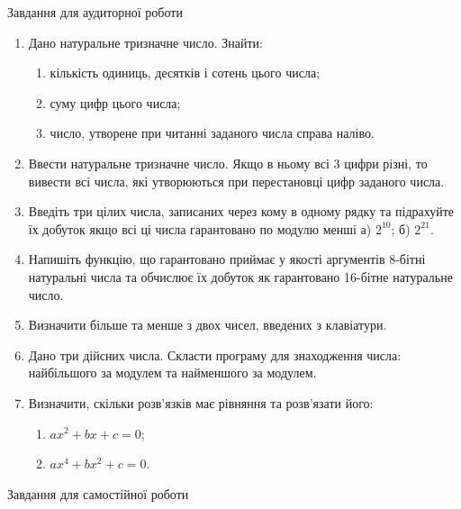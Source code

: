\documentclass[]{article}
\makeatletter
\newcommand{\xslalph}[1]{\expandafter\@xslalph\csname c@#1\endcsname}
\newcommand{\@xslalph}[1]{%
    \ifcase#1\or а\or б\or в\or г\or д\or e\or є\or ж\or з\or i%
    \or й\or к\or л\or м\or н\or о\or п\or р\or с\or т%
    \or у\or ф\or х\or ц\or ч\or ш\or ю\or я\or аа\or бб\or вв %
    \else\@ctrerr\fi%
}
\makeatother
\begin{document}
Завдання для аудиторної роботи
\begin{enumerate}
\def\labelenumi{\arabic{enumi})}
\item
Дано натуральне тризначне число. Знайти:
  \begin{enumerate}[label=\xslalph*)]
\item кількість одиниць, десятків і сотень цього числа;
\item суму цифр цього числа;
\item число, утворене при читанні заданого числа справа наліво.
\end{enumerate}

\item
Ввести натуральне тризначне число. Якщо в ньому всі 3 цифри різні, то
вивести всі числа, які утворюються при перестановці цифр заданого числа.
\item
Введіть три цілих числа, записаних через кому в одному рядку та
підрахуйте їх добуток якщо всі ці числа гарантовано по модулю менші а)
\(2^{10}\); б) \(2^{21}\).

\item
Напишіть функцію, що гарантовано приймає у якості аргументів 8-бітні
натуральні числа та обчислює їх добуток як гарантовано 16-бітне
натуральне число.
\item
Визначити більше та менше з двох чисел, введених з клавіатури.
\item
Дано три дійсних числа. Скласти програму для знаходження числа:
найбільшого за модулем та найменшого за модулем.
\item
Визначити, скільки розв'язків має рівняння та розв'язати його:
  \begin{enumerate}[label=\xslalph*)]
\item \(ax^{2} + bx + c = 0\);
\item \(ax^{4} + bx^{2} + c = 0\).
  \end{enumerate}
\end{enumerate}

Завдання для самостійної роботи
\end{document}
